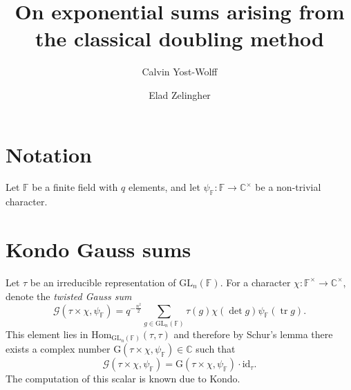 \documentclass[12pt, reqno]{amsart}
\title{On exponential sums arising from the classical doubling method}
\author{Calvin Yost-Wolff}
\author{Elad Zelingher}
\theoremstyle{definition}
\theoremstyle{definition}
\theoremstyle{definition}
\newcommand{\cComplex}{\mathbb{C}}
\newcommand{\multiplicativegroup}[1]{#1^{\times}}
\newcommand{\Hom}{\mathrm{Hom}}
\newcommand{\idmap}{\mathrm{id}}
\newcommand{\fieldCharacter}{\psi}
\newcommand{\trace}{\operatorname{tr}}
\newcommand{\GL}{\mathrm{GL}}
\newcommand{\finiteField}{\mathbb{F}}
\newcommand{\GaussSum}[2]{\mathcal{G}\left(#1, #2\right)}
\newcommand{\GaussSumScalar}[2]{\mathrm{G}\left(#1, #2\right)}
\begin{document}
\begin{abstract}
\end{abstract}
\maketitle

\section{Notation}
Let $\finiteField$ be a finite field with $q$ elements, and let $\fieldCharacter_{\finiteField} \colon \finiteField \to \multiplicativegroup{\cComplex}$ be a non-trivial character. 

\section{Kondo Gauss sums}
Let $\tau$ be an irreducible representation of $\GL_n\left(\finiteField\right)$. 
For a character $\chi \colon \multiplicativegroup{\finiteField} \to \multiplicativegroup{\cComplex}$, denote the \emph{twisted Gauss sum}
$$\GaussSum{\tau \times \chi}{\fieldCharacter_{\finiteField}} = q^{-\frac{n^2}{2}} \sum_{g \in \GL_n\left(\finiteField\right)} \tau\left(g\right) \chi\left(\det g\right) \fieldCharacter_{\finiteField}\left(\trace g\right).$$
This element lies in $\Hom_{\GL_n\left(\finiteField\right)}\left(\tau, \tau\right)$ and therefore by Schur's lemma there exists a complex number $\GaussSumScalar{\tau \times \chi}{\fieldCharacter_{\finiteField}} \in \cComplex$ such that
$$\GaussSum{\tau \times \chi}{\fieldCharacter_{\finiteField}} = \GaussSumScalar{\tau \times \chi}{\fieldCharacter_{\finiteField}} \cdot \idmap_\tau.$$ The computation of this scalar is known due to Kondo.
\end{document}
